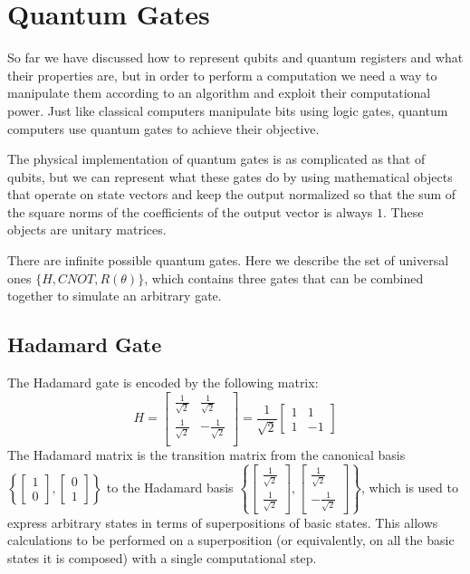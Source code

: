\documentclass[12pt,a4paper]{report}
\theoremstyle{definition}
\theoremstyle{definition}
\theoremstyle{definition}
\begin{document}
\section{Quantum Gates}
So far we have discussed how to represent qubits and quantum registers and what their properties are, but in order to perform a computation we need a way to manipulate them according to an algorithm and exploit their computational power. Just like classical computers manipulate bits using logic gates, quantum computers use quantum gates to achieve their objective.

The physical implementation of quantum gates is as complicated as that of qubits, but we can represent what these gates do by using mathematical objects that operate on state vectors and keep the output normalized so that the sum of the square norms of the coefficients of the output vector is always $1$. These objects are unitary matrices.

There are infinite possible quantum gates. Here we describe the set of universal ones $\{H, CNOT, R(\theta)\}$, which contains three gates that can be combined together to simulate an arbitrary gate.\\




\subsection{Hadamard Gate}
The Hadamard gate is encoded by the following matrix:
\begin{equation*}
    H=\begin{bmatrix}
        \frac{1}{\sqrt{2}} & \frac{1}{\sqrt{2}} \\
        \frac{1}{\sqrt{2}} & -\frac{1}{\sqrt{2}} \\
    \end{bmatrix}=\frac{1}{\sqrt{2}}\begin{bmatrix}
        1 & 1 \\
        1 & -1
    \end{bmatrix}
\end{equation*}
The Hadamard matrix is the transition matrix from the canonical basis $\left\{\begin{bmatrix} 1 \\ 0\end{bmatrix}, \begin{bmatrix} 0 \\ 1\end{bmatrix}\right\}$ to the Hadamard basis $\left\{\begin{bmatrix} \frac{1}{\sqrt{2}} \\ \frac{1}{\sqrt{2}}\end{bmatrix}, \begin{bmatrix} \frac{1}{\sqrt{2}} \\ -\frac{1}{\sqrt{2}}\end{bmatrix}\right\}$, which is used to express arbitrary states in terms of superpositions of basic states. This allows calculations to be performed on a superposition (or equivalently, on all the basic states it is composed) with a single computational step.
\end{document}
